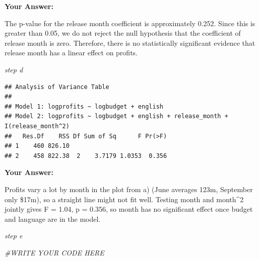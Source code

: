 \documentclass[
]{article}
\newenvironment{Shaded}{\begin{snugshade}}{\end{snugshade}}
\newcommand{\AttributeTok}[1]{\textcolor[rgb]{0.13,0.29,0.53}{#1}}
\newcommand{\CommentTok}[1]{\textcolor[rgb]{0.56,0.35,0.01}{\textit{#1}}}
\newcommand{\DecValTok}[1]{\textcolor[rgb]{0.00,0.00,0.81}{#1}}
\newcommand{\FunctionTok}[1]{\textcolor[rgb]{0.13,0.29,0.53}{\textbf{#1}}}
\newcommand{\NormalTok}[1]{#1}
\newcommand{\OtherTok}[1]{\textcolor[rgb]{0.56,0.35,0.01}{#1}}
\newcommand{\SpecialCharTok}[1]{\textcolor[rgb]{0.81,0.36,0.00}{\textbf{#1}}}
\newcommand{\StringTok}[1]{\textcolor[rgb]{0.31,0.60,0.02}{#1}}
\begin{document}
\textbf{Your Answer:}

The p-value for the release month coefficient is approximately 0.252.
Since this is greater than 0.05, we do not reject the null hypothesis
that the coefficient of release month is zero. Therefore, there is no
statistically significant evidence that release month has a linear
effect on profits.

\emph{step d}

\begin{Shaded}
\end{Shaded}

\begin{verbatim}
## Analysis of Variance Table
## 
## Model 1: logprofits ~ logbudget + english
## Model 2: logprofits ~ logbudget + english + release_month + I(release_month^2)
##   Res.Df    RSS Df Sum of Sq      F Pr(>F)
## 1    460 826.10                           
## 2    458 822.38  2    3.7179 1.0353  0.356
\end{verbatim}

\textbf{Your Answer:}

Profits vary a lot by month in the plot from a) (June averages 123m,
September only \$17m), so a straight line might not fit well. Testing
month and month\^{}2 jointly gives F = 1.04, p = 0.356, so month has no
significant effect once budget and language are in the model.

\emph{step e}

\begin{Shaded}
\begin{Highlighting}[]
\CommentTok{\#WRITE YOUR CODE HERE}
\end{Highlighting}
\end{Shaded}
\end{document}
